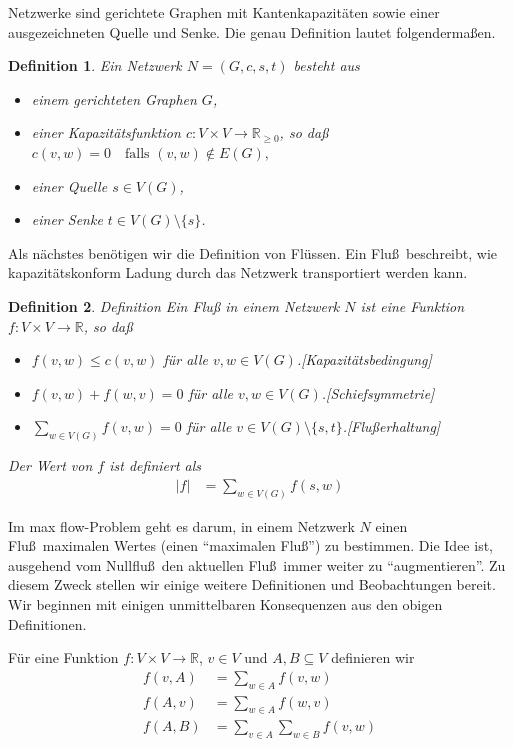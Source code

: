 \documentclass[10pt,reqno]{amsart}
\numberwithin{equation}{section}
\renewcommand\subset{\subseteq}
\newcommand\alert[1]{\emph{#1}}
\newcommand\RR{\mathbb R}
\newcommand\RRpos{\mathbb R_{\geq0}}
\newtheorem{definition}{Definition}[section]
\begin{document}
Netzwerke sind gerichtete Graphen mit Kantenkapazit\"aten sowie einer ausgezeichneten Quelle und Senke.
Die genau Definition lautet folgenderma\ss en.

\begin{definition}
	Ein \alert{Netzwerk} $N=(G,c,s,t)$ besteht aus
	\begin{itemize}
		\item einem gerichteten Graphen $G$,
		\item einer Kapazit\"atsfunktion $c:V\times V\to\RRpos$, so da\ss $c(v,w)=0\quad\mbox{falls }(v,w)\not\in E(G),$
		\item einer Quelle $s\in V(G)$,
		\item einer Senke $t\in V(G)\setminus\{s\}$.
	\end{itemize}
\end{definition}

Als n\"achstes ben\"otigen wir die Definition von Fl\"ussen.
Ein Flu\ss\ beschreibt, wie kapazit\"atskonform Ladung durch das Netzwerk transportiert werden kann.

\begin{definition}{Definition}
	Ein \alert{Flu\ss} in einem Netzwerk $N$ ist eine Funktion $f:V\times V\to\RR$, so da\ss
	\begin{itemize}
		\item $f(v,w)\leq c(v,w)$ f\"ur alle $v,w\in V(G)$.\hfill[Kapazit\"atsbedingung]
		\item $f(v,w)+f(w,v)=0$ f\"ur alle $v,w\in V(G)$.\hfill[Schiefsymmetrie]
		\item $\sum_{w\in V(G)}f(v,w)=0$ f\"ur alle $v\in V(G)\setminus\{s,t\}$.\hfill[Flu\ss erhaltung]
	\end{itemize}
	Der \alert{Wert} von $f$ ist definiert als
	\begin{align*}
		|f|&=\sum_{w\in V(G)}f(s,w)
	\end{align*}
\end{definition}

Im max flow-Problem geht es darum, in einem Netzwerk $N$ einen Flu\ss\ maximalen Wertes (einen ``maximalen Flu\ss'') zu bestimmen.
Die Idee ist, ausgehend vom Nullflu\ss\ den aktuellen Flu\ss\ immer weiter zu ``augmentieren''.
Zu diesem Zweck stellen wir einige weitere Definitionen und Beobachtungen bereit.
Wir beginnen mit einigen unmittelbaren Konsequenzen aus den obigen Definitionen.

F\"ur eine Funktion $f:V\times V\to \RR$, $v\in V$ und $A,B\subset V$ definieren wir
\begin{align*}
	f(v,A)&=\sum_{w\in A}f(v,w)\\
	f(A,v)&=\sum_{w\in A}f(w,v)\\
	f(A,B)&=\sum_{v\in A}\sum_{w\in B}f(v,w)
\end{align*}
\end{document}
